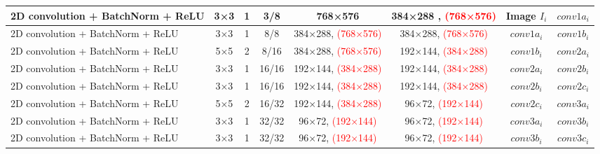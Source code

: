 \begin{table}[htbp]
\begin{adjustbox}{width=1\textwidth}
\begin{tabular}{|l|c|c|c|c|c|c|c|}
\hspace{0.75cm}2D convolution + BatchNorm + ReLU                           & 3×3             & 1               & 3/8            & 768×576         & 384×288 , \textcolor{red}{(768×576)}        & Image $I_i$           & $conv1a_i$          \\ \hline
\hspace{0.75cm}2D convolution + BatchNorm + ReLU                            & 3×3             & 1               & 8/8            & 384×288, \textcolor{red}{(768×576)}         & 384×288, \textcolor{red}{(768×576)}         & $conv1a_i$           & $conv1b_i$          \\ \hline
\hspace{0.75cm}2D convolution + BatchNorm + ReLU                            & 5×5             & 2               & 8/16           & 384×288, \textcolor{red}{(768×576)}          & 192×144, \textcolor{red}{(384×288)}         & $conv1b_i$            & $conv2a_i$          \\ \hline
\hspace{0.75cm}2D convolution + BatchNorm + ReLU                            & 3×3             & 1               & 16/16          & 192×144, \textcolor{red}{(384×288)}         & 192×144, \textcolor{red}{(384×288)}         &  $conv2a_i$           &  $conv2b_i$         \\ \hline
\hspace{0.75cm}2D convolution + BatchNorm + ReLU                            & 3×3             & 1               & 16/16          & 192×144, \textcolor{red}{(384×288)}         & 192×144, \textcolor{red}{(384×288)}        &  $conv2b_i$           &  $conv2c_i$          \\ \hline
\hspace{0.75cm}2D convolution + BatchNorm + ReLU                            & 5×5             & 2               & 16/32           & 192×144, \textcolor{red}{(384×288)}         & 96×72, \textcolor{red}{(192×144)}         & $conv2c_i$            & $conv3a_i$           \\ \hline
\hspace{0.75cm}2D convolution + BatchNorm + ReLU                            & 3×3             & 1               & 32/32         & 96×72, \textcolor{red}{(192×144)}         & 96×72, \textcolor{red}{(192×144)}          & $conv3a_i$             & $conv3b_i$          \\ \hline
\hspace{0.75cm}2D convolution + BatchNorm + ReLU                            & 3×3             & 1               & 32/32        & 96×72, \textcolor{red}{(192×144)}         & 96×72, \textcolor{red}{(192×144)}           & $conv3b_i$            & $conv3c_i$         \\ \hline


\end{tabular}
\end{adjustbox}
\end{table}
